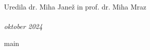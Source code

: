\documentclass[graybox, envcountchap]{svmult}
\begin{document}
\large Uredila dr. Miha Janež in prof. dr. Miha Mraz\\
\\
\normalsize \emph{oktober 2024}





% 
% 

\tableofcontents




{main}

%




\backmatter





\end{document}
